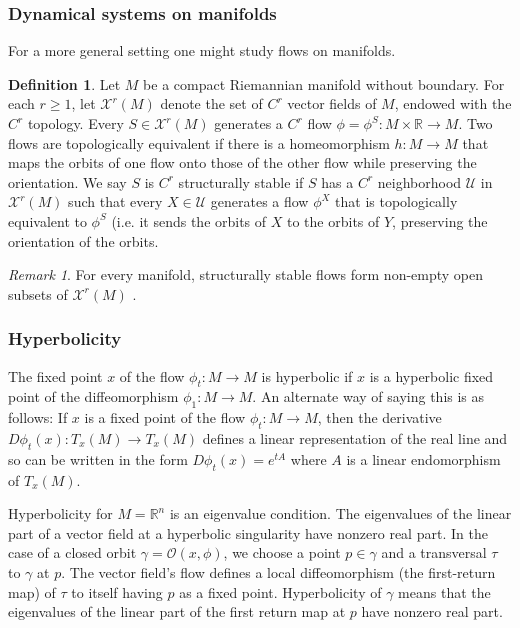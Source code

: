 \documentclass{article}
\theoremstyle{definition} \newtheorem{definition}{Definition}
\theoremstyle{remark} \newtheorem{remark}{Remark}
\newcommand{\reals}{\mathbb{R}}
\newcommand{\mcU}{\mathcal{U}}
\newcommand{\mcX}{\mathcal{X}}
\newcounter{ct}
\begin{document}
\subsubsection{Dynamical systems on manifolds}
For a more general setting one might study flows on manifolds.
\begin{definition}
Let $M$ be a compact Riemannian manifold without boundary. For each $r\geq 1$, let $\mcX^r(M)$ denote the set of $C^r$ vector fields of $M$, endowed with the $C^r$ topology. Every $S\in \mcX^r(M)$ generates a $C^r$ flow $\phi=\phi^S\colon M\times \reals\rightarrow M$.
Two flows are topologically equivalent if there is a homeomorphism $h\colon M\rightarrow M$ that maps the orbits of one flow onto those of the other flow while preserving the orientation. 
 We say $S$ is $C^r$ structurally stable if $S$ has a $C^r$ neighborhood $\mcU$ in $\mcX^r(M)$ such that every $X \in \mcU$ generates a flow $\phi^X$ that is topologically equivalent to $\phi^S$ (i.e. it sends the orbits of $X$ to the orbits of $Y$, preserving the orientation of the orbits.
\end{definition}

\begin{remark}
For every manifold, structurally stable flows form non-empty open subsets of $\mcX^r(M)$ \citep{palis1970ss}.
\end{remark}

\subsubsection{Hyperbolicity}
The fixed point $x$ of the flow $\phi_t\colon M\rightarrow M$ is hyperbolic if $x$ is a hyperbolic fixed point of the diffeomorphism $\phi_1: M\rightarrow M$.
 An alternate way of saying this is as follows: If $x$ is a fixed point of the flow $\phi_t\colon M\rightarrow M$, then the derivative $D\phi_t(x)\colon T_x(M)\rightarrow T_x(M)$ defines a linear representation of the real line and so can be written in the form $D\phi_t(x)=e^{tA}$ where $A$ is a linear endomorphism of $T_x(M)$.


Hyperbolicity for $M=\reals^n$ is an eigenvalue condition.
The eigenvalues of the linear part of a vector field at a hyperbolic singularity have nonzero real part.
In the case of a closed orbit $\gamma=\mathcal{O}(x,\phi)$, we choose a point $p\in\gamma$ and a transversal $\tau$ to $\gamma$ at $p$.
The vector field's flow defines a local diffeomorphism (the first-return map) of $\tau$ to itself having $p$ as a fixed point.
Hyperbolicity of $\gamma$ means that the eigenvalues of the linear part of the first return map at $p$ have nonzero real part.
   
\end{document}

